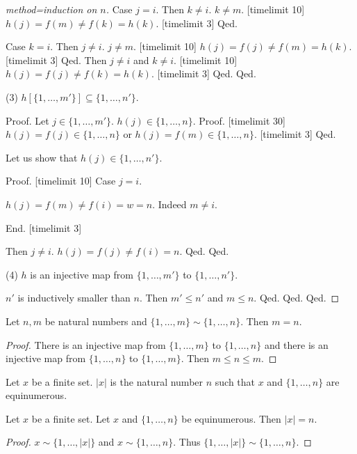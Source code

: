 \documentclass{article}
\newcommand{\Seq}[2]{\{#1,\dots,#2\}}
\begin{document}
\begin{forthel}
\begin{proof}[method=induction on $n$]
  Case $j = i$.
  Then $k \neq i$. $k \neq m$. [timelimit 10]
  $h(j) = f(m) \neq f(k) = h(k)$. [timelimit 3]
  Qed.

  Case $k = i$.
  Then $j \neq i$. $j \neq m$. [timelimit 10]
  $h(j) = f(j) \neq f(m) = h(k)$. [timelimit 3]
  Qed.
  Then $j \neq i$ and $k \neq i$. [timelimit 10]
  $h(j) = f(j) \neq f(k) = h(k)$. [timelimit 3]
  Qed.
  Qed.

(3)  $h[\Seq{1}{m'}] \subseteq \Seq{1}{n'}$.

Proof.
  Let $j \in \Seq{1}{m'}$.
  $h(j) \in \Seq{1}{n}$.
  Proof.
  [timelimit 30]
  $h(j) = f(j) \in \Seq{1}{n}$ or $h(j) = f(m) \in \Seq{1}{n}$.
  [timelimit 3]
  Qed.

  Let us show that  $h(j) \in \Seq{1}{n'}$.

  Proof.
[timelimit 10]
    Case $j = i$.

    $h(j) = f(m) \neq f(i) = w = n$. Indeed $m \neq i$.

End.
[timelimit 3]

    Then $j \neq i$.
    $h(j) = f(j) \neq f(i) = n$.
  Qed.
  Qed.

(4) $h$ is an injective map from $\Seq{1}{m'}$ to $\Seq{1}{n'}$.

  $n'$ is inductively smaller than $n$.
Then $m' \leq n'$ and $m \leq n$.
  Qed.
  Qed.
  Qed.
  \end{proof}


  \begin{lemma}
  Let $n,m$ be natural numbers and
  $\Seq{1}{m} \sim \Seq{1}{n}$. Then $m = n$.
  \end{lemma}
  \begin{proof}
  There is an injective map from
  $\Seq{1}{m}$ to $\Seq{1}{n}$ and
  there is an injective map from
  $\Seq{1}{n}$ to $\Seq{1}{m}$. Then $m \leq n \leq m$.
  \end{proof}

  \begin{signature}
  Let $x$ be a finite set. $|x|$ is the natural number $n$
  such that $x$ and $\Seq{1}{n}$ are equinumerous.
  \end{signature}

  \begin{lemma} Let $x$ be a finite set.
  Let $x$ and $\Seq{1}{n}$ be equinumerous. Then
  $|x| = n$.
  \end{lemma}
  \begin{proof}
  $x \sim \Seq{1}{|x|}$ and $x \sim \Seq{1}{n}$. Thus $\Seq{1}{|x|} \sim \Seq{1}{n}$.
  \end{proof}


\end{forthel}
\end{document}
